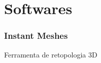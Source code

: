 \section{Softwares}

\begin{frame}
  \frametitle{Instant Meshes}

  Ferramenta de retopologia 3D

\end{frame}

